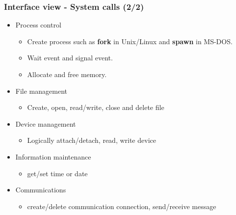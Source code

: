 \documentclass[CJKutf8,xcolor=pdftex,dvipsnames,table]{beamer}
\begin{document}
\begin{CJK*}{UTF8}{song}
  \begin{frame}
    \frametitle{Interface view - System calls (2/2)} \pause
    \begin{itemize}
    \item{Process control} \pause
      \begin{itemize}
      \item{Create process such as \textbf{fork} in Unix/Linux and \textbf{spawn} in MS-DOS.} \pause
      \item{Wait event and signal event.} \pause
      \item{Allocate and free memory.} \pause
      \end{itemize}
    \item{File management} \pause
      \begin{itemize}
      \item{Create, open, read/write, close and delete file} \pause
      \end{itemize}
    \item{Device management} \pause
      \begin{itemize}
      \item{Logically attach/detach, read, write device} \pause
      \end{itemize}
    \item{Information maintenance} \pause
      \begin{itemize}
      \item{get/set time or date} \pause
      \end{itemize}
    \item{Communications} \pause
      \begin{itemize}
      \item{create/delete communication connection, send/receive message}
      \end{itemize}
    \end{itemize}
  \end{frame}


\end{CJK*}
\end{document}
